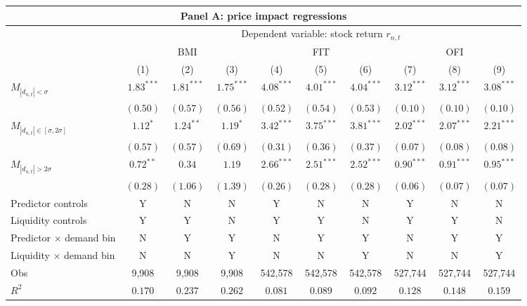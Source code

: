 \begin{tabular}{lccccccccc}
  \hline \multicolumn{10}{c}{Panel A: price impact regressions} \\
 \hline
                                    & \multicolumn{9}{c}{Dependent variable: stock return $r_{n,t}$} \\

                                    \cmidrule(l){2-10} & \multicolumn{3}{c}{BMI} & \multicolumn{3}{c}{FIT} & \multicolumn{3}{c}{OFI} \\
 \cmidrule(l){2-4} \cmidrule(l){5-7} \cmidrule(l){8-10} 
  & (1) & (2) & (3) & (4) & (5) & (6) & (7) & (8) & (9) \\ 
  $M_{|d_{n,t}| < \sigma}$ & $1.83^{***}$ & $1.81^{***}$ & $1.75^{***}$ & $4.08^{***}$ & $4.01^{***}$ & $4.04^{***}$ & $3.12^{***}$ & $3.12^{***}$ & $3.08^{***}$ \\ 
   & $(0.50)$ & $(0.57)$ & $(0.56)$ & $(0.52)$ & $(0.54)$ & $(0.53)$ & $(0.10)$ & $(0.10)$ & $(0.10)$ \\ 
  $M_{|d_{n,t}| \in [\sigma, 2\sigma]}$ & $1.12^{*}$ & $1.24^{**}$ & $1.19^{*}$ & $3.42^{***}$ & $3.75^{***}$ & $3.81^{***}$ & $2.02^{***}$ & $2.07^{***}$ & $2.21^{***}$ \\ 
   & $(0.57)$ & $(0.57)$ & $(0.69)$ & $(0.31)$ & $(0.36)$ & $(0.37)$ & $(0.07)$ & $(0.08)$ & $(0.08)$ \\ 
  $M_{|d_{n,t}| > 2 \sigma}$ & $0.72^{**}$ & $0.34$ & $1.19$ & $2.66^{***}$ & $2.51^{***}$ & $2.52^{***}$ & $0.90^{***}$ & $0.91^{***}$ & $0.95^{***}$ \\ 
   \vspace{5pt} & $(0.28)$ & $(1.06)$ & $(1.39)$ & $(0.26)$ & $(0.28)$ & $(0.28)$ & $(0.06)$ & $(0.07)$ & $(0.07)$ \\ 
  Predictor controls & Y & N & N & Y & N & N & Y & N & N \\ 
  Liquidity controls & Y & Y & N & Y & Y & N & Y & Y & N \\ 
  Predictor $\times$ demand bin & N & Y & Y & N & Y & Y & N & Y & Y \\ 
   \vspace{5pt}Liquidity $\times$ demand bin & N & N & Y & N & N & Y & N & N & Y \\ 
  Obs & 9,908 & 9,908 & 9,908 & 542,578 & 542,578 & 542,578 & 527,744 & 527,744 & 527,744 \\ 
  $R^2$ & $0.170$ & $0.237$ & $0.262$ & $0.081$ & $0.089$ & $0.092$ & $0.128$ & $0.148$ & $0.159$ \\ 

\end{tabular}
